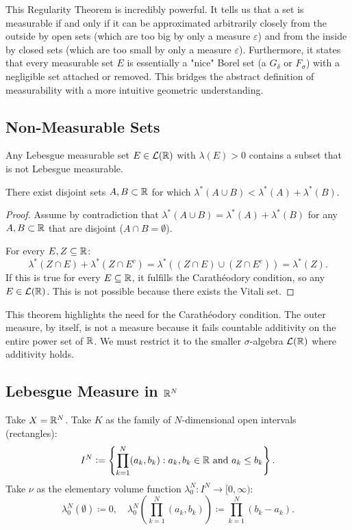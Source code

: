 \begin{remark}
This Regularity Theorem is incredibly powerful. It tells us that a set is measurable if and only if it can be approximated arbitrarily closely from the outside by open sets (which are too big by only a measure $\varepsilon$) and from the inside by closed sets (which are too small by only a measure $\varepsilon$). Furthermore, it states that every measurable set $E$ is essentially a "nice" Borel set (a $G_\delta$ or $F_\sigma$) with a negligible set attached or removed. This bridges the abstract definition of measurability with a more intuitive geometric understanding.
\end{remark}

\clearpage
\subsection{Non-Measurable Sets}

\begin{theorem}[Vitali]
Any Lebesgue measurable set $E \in \mathcal{L}(\mathbb{R})$ with $\lambda(E) > 0$ contains a subset that is not Lebesgue measurable.
\end{theorem}

\begin{theorem}
There exist disjoint sets $A, B \subset \mathbb{R}$ for which $\lambda^*(A \cup B) < \lambda^*(A) + \lambda^*(B)$.
\end{theorem}

\begin{proof}
Assume by contradiction that $\lambda^*(A \cup B) = \lambda^*(A) + \lambda^*(B)$ for any $A, B \subset \mathbb{R}$ that are disjoint ($A \cap B = \emptyset$).

For every $E, Z \subseteq \mathbb{R}$:
\[
\lambda^*(Z \cap E) + \lambda^*(Z \cap E^c) = \lambda^*((Z \cap E) \cup (Z \cap E^c)) = \lambda^*(Z).
\]
If this is true for every $E \subseteq \mathbb{R}$, it fulfills the Carathéodory condition, so any $E \in \mathcal{L}(\mathbb{R})$. This is not possible because there exists the Vitali set.
\end{proof}

\begin{remark}
This theorem highlights the need for the Carathéodory condition. The outer measure, by itself, is not a measure because it fails countable additivity on the entire power set of $\mathbb{R}$. We must restrict it to the smaller $\sigma$-algebra $\mathcal{L}(\mathbb{R})$ where additivity holds.
\end{remark}

\subsection{Lebesgue Measure in $\mathbb{R}^N$}
Take $X = \mathbb{R}^N$. Take $K$ as the family of $N$-dimensional open intervals (rectangles):
\[
I^N \mathrel{\mathop:}= \left\{\prod_{k=1}^{N} (a_k, b_k) : a_k, b_k \in \mathbb{R} \text{ and } a_k \leq b_k\right\}.
\]
Take $\nu$ as the elementary volume function $\lambda_0^N: I^N \to [0, \infty)$:
\[
\lambda_0^N(\emptyset) \coloneqq 0, \quad \lambda_0^N\left(\prod_{k=1}^{N} (a_k, b_k)\right) \coloneqq \prod_{k=1}^{N} (b_k - a_k).
\]

